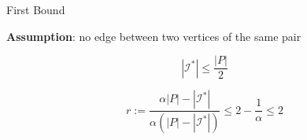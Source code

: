\begin{frame}{First Bound}

\textbf{Assumption}: no edge between two vertices of the same pair


\pause
\begin{observation}
$$ |\mathcal{I}^*| \leq \frac{|P|}{2} $$
\end{observation}

\pause
\begin{corollary}
$$
r 													:= 
\frac{\alpha |P| - |\mathcal{I}^*|}{\alpha (|P| - |\mathcal{I}^*|)} 	\leq 
2 - \frac{1}{\alpha} 								\leq 
2
$$
\end{corollary}


\end{frame}

